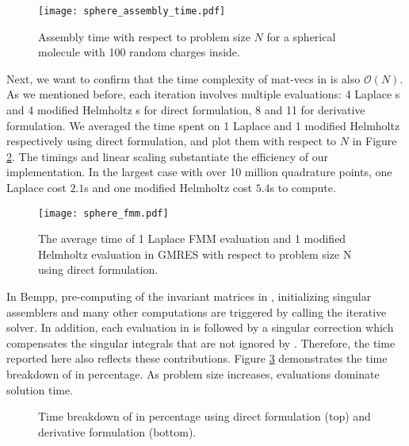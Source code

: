 \begin{figure}[htbp]
    \centering
    \texttt{[image: sphere\_assembly\_time.pdf]} 
    \caption{Assembly time with respect to problem size $N$ for a spherical molecule with 100 random charges inside.}
    \label{fig:sphere_assembly_time}
\end{figure}

Next, we want to confirm that the time complexity of mat-vecs in \gmres is also $\mathcal{O}(N)$.
As we mentioned before, each iteration involves multiple \fmm evaluations: 4 Laplace {\fmm}s and 4 modified Helmholtz {\fmm}s for direct formulation, 8 and 11 for derivative formulation.
We averaged the time spent on 1 Laplace \fmm and 1 modified Helmholtz \fmm respectively using direct formulation, and plot them with respect to $N$ in Figure \ref{fig:sphere_fmm}.
The timings and linear scaling substantiate the efficiency of our \fmm implementation.
In the largest case with over 10 million quadrature points, one Laplace \fmm cost $2.1$s and one modified Helmholtz \fmm cost $5.4$s to compute.


\begin{figure}[htbp]
    \centering
    \texttt{[image: sphere\_fmm.pdf]} 
    \caption{The average time of 1 Laplace FMM evaluation and 1 modified Helmholtz evaluation in GMRES with respect to problem size N using direct formulation.}
    \label{fig:sphere_fmm}
\end{figure}

In Bempp, pre-computing of the invariant matrices in \fmm, initializing singular assemblers and many other computations are triggered by calling the iterative solver.
In addition, each \fmm evaluation in \gmres is followed by a singular correction which compensates the singular integrals that are not ignored by \fmm.
Therefore, the \gmres time reported here also reflects these contributions.
Figure \ref{fig:sphere_gmres} demonstrates the time breakdown of \gmres in percentage.
As problem size increases, \fmm evaluations dominate solution time.

\begin{figure}[htbp]
    \begin{subfigure}{\columnwidth}
        \centering
    \end{subfigure}

    \begin{subfigure}{\columnwidth}
        \centering
    \end{subfigure}

    \caption{Time breakdown of \gmres in percentage using direct formulation (top) and derivative formulation (bottom).}
    \label{fig:sphere_gmres}
\end{figure}

